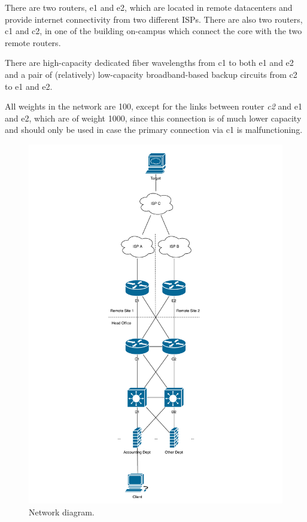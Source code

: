 \documentclass[11pt,a4paper,oneside]{article}
\begin{document}
            There are two routers, e1 and e2, which are located in remote datacenters and provide internet connectivity from two different ISPs.
            There are also two routers, c1 and c2, in one of the building on-campus which connect the core with the two remote routers.

            There are high-capacity dedicated fiber wavelengths from c1 to both e1 and e2 and a pair of (relatively) low-capacity broadband-based backup circuits from c2 to e1 and e2.

    		All weights in the network are 100, except for the links between router \textit{c2} and e1 and e2, which are of weight 1000, since this connection is of much lower capacity and should only be used in case the primary connection via c1 is malfunctioning.


    \begin{figure}[htb]
        \centering
        \includegraphics[height=\textheight]{netdiagram.pdf}
        \caption{Network diagram.}
        \label{netdiagram}
    \end{figure}
\end{document}
